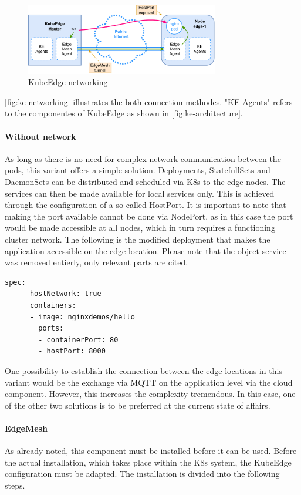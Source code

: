 \documentclass[MSC,Master,english]{twbook}%
\begin{document}
\begin{figure}[ht]
    \centering
    \includegraphics[width=0.75\textwidth]{PICs/drawio/ke-network.drawio.pdf}
    \caption{KubeEdge networking}
    \label{fig:ke-networking}
\end{figure}

\autoref{fig:ke-networking} illustrates the both connection methodes. "KE Agents" refers to the componentes of KubeEdge as shown in \autoref{fig:ke-architecture}.

\paragraph{Without network} As long as there is no need for complex network communication between the pods, this variant offers a simple solution. Deployments, StatefullSets and DaemonSets can be distributed and scheduled via \ac{K8s} to the edge-nodes. The services can then be made available for local services only. This is achieved through the configuration of a so-called HostPort. It is important to note that making the port available cannot be done via NodePort, as in this case the port would be made accessible at all nodes, which in turn requires a functioning cluster network. The following is the modified deployment that makes the application accessible on the edge-location. Please note that the object service was removed entierly, only relevant parts are cited.
\begin{lstlisting}[caption={Web-application HostPort },captionpos=b]
    spec:
      hostNetwork: true
      containers:
      - image: nginxdemos/hello
        ports:
        - containerPort: 80
        - hostPort: 8000
\end{lstlisting}

One possibility to establish the connection between the edge-locations in this variant would be the exchange via MQTT on the application level via the cloud component. However, this increases the complexity tremendous. In this case, one of the other two solutions is to be preferred at the current state of affairs.

\paragraph{EdgeMesh} As already noted, this component must be installed before it can be used. Before the actual installation, which takes place within the \ac{K8s} system, the KubeEdge configuration must be adapted. The installation is divided into the following steps.
\end{document}

